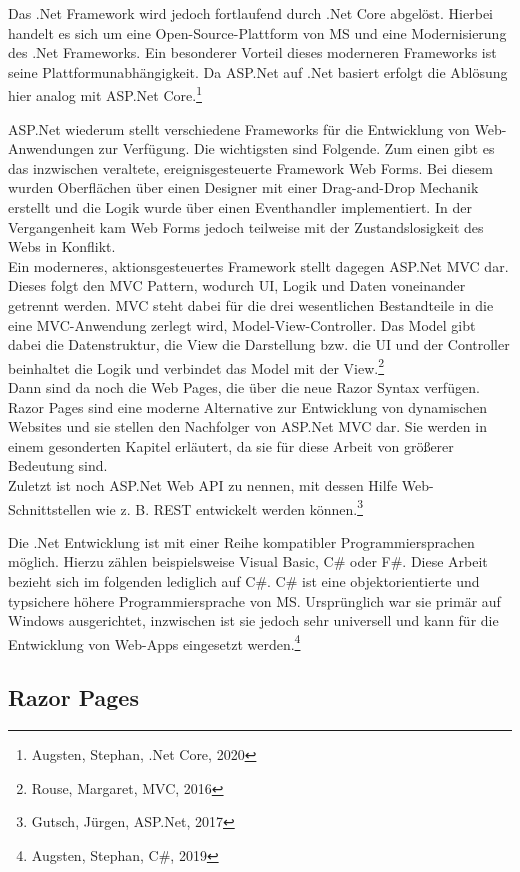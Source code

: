 \documentclass[a4paper,
12pt,
oneside]
{article}
\newcommand{\sPar}{\par\vspace*{6pt}}
\begin{document}
	Das .Net Framework wird jedoch fortlaufend durch .Net Core abgelöst. Hierbei handelt es sich um eine Open-Source-Plattform von MS und eine Modernisierung des .Net Frameworks. Ein besonderer Vorteil dieses moderneren Frameworks ist seine Plattformunabhängigkeit. Da ASP.Net auf .Net basiert erfolgt die Ablösung hier analog mit ASP.Net Core.\footnote{Augsten, Stephan, .Net Core, 2020} \sPar
	ASP.Net wiederum stellt verschiedene Frameworks für die Entwicklung von Web-Anwendungen zur Verfügung. Die wichtigsten sind Folgende. Zum einen gibt es das inzwischen veraltete, ereignisgesteuerte Framework \glqq Web Forms\grqq. Bei diesem wurden Oberflächen über einen Designer mit einer Drag-and-Drop Mechanik erstellt und die Logik wurde über einen Eventhandler implementiert. In der Vergangenheit kam Web Forms jedoch teilweise mit der Zustandslosigkeit des Webs in Konflikt. \\
	Ein moderneres, aktionsgesteuertes Framework stellt dagegen ASP.Net MVC dar. Dieses folgt den MVC Pattern, wodurch UI, Logik und Daten voneinander getrennt werden. MVC steht dabei für die drei wesentlichen Bestandteile in die eine MVC-Anwendung zerlegt wird, \glqq Model-View-Controller\grqq. Das Model gibt dabei die Datenstruktur, die View die Darstellung bzw. die UI und der Controller beinhaltet die Logik und verbindet das Model mit der View.\footnote{Rouse, Margaret, MVC, 2016} \\
	Dann sind da noch die Web Pages, die über die neue Razor Syntax verfügen. Razor Pages sind eine moderne Alternative zur Entwicklung von dynamischen Websites und sie stellen den Nachfolger von ASP.Net MVC dar. Sie werden in einem gesonderten Kapitel erläutert, da sie für diese Arbeit von größerer Bedeutung sind. \\
	Zuletzt ist noch ASP.Net Web API zu nennen, mit dessen Hilfe Web-Schnittstellen wie z. B. REST entwickelt werden können.\footnote{Gutsch, Jürgen, ASP.Net, 2017} \sPar
	Die .Net Entwicklung ist mit einer Reihe kompatibler Programmiersprachen möglich. Hierzu zählen beispielsweise Visual Basic, C\# oder F\#. Diese Arbeit bezieht sich im folgenden lediglich auf C\#. C\# ist eine objektorientierte und typsichere höhere Programmiersprache von MS. Ursprünglich war sie primär auf Windows ausgerichtet, inzwischen ist sie jedoch sehr universell und kann für die Entwicklung von Web-Apps eingesetzt werden.\footnote{Augsten, Stephan, C\#, 2019}
	
	
	
	\subsection{Razor Pages}
	
\end{document}
